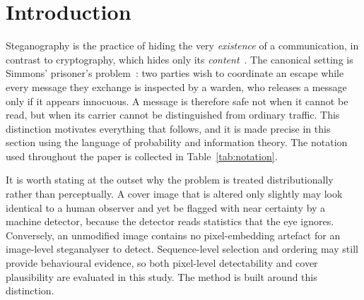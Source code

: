 \documentclass[10pt,a4paper]{article}
\theoremstyle{definition}
\begin{document}
\section{Introduction}\label{sec:intro}
Steganography is the practice of hiding the very \emph{existence} of a
communication, in contrast to cryptography, which hides only its
\emph{content}~\cite{provos2003}. The canonical setting is Simmons' prisoner's
problem~\cite{simmons}: two parties wish to coordinate an escape while every message they
exchange is inspected by a warden, who releases a message only if it appears
innocuous. A message is therefore safe not when it cannot be read, but when its
carrier cannot be distinguished from ordinary traffic. This distinction motivates
everything that follows, and it is made precise in this section using the language
of probability and information theory. The notation used throughout the paper is
collected in Table~\ref{tab:notation}.

It is worth stating at the outset why the problem is treated distributionally
rather than perceptually. A cover image that is altered only slightly may look
identical to a human observer and yet be flagged with near certainty by a machine
detector, because the detector reads statistics that the eye ignores. Conversely,
an unmodified image contains no pixel-embedding artefact for an image-level
steganalyser to detect. Sequence-level selection and ordering may still provide
behavioural evidence, so both pixel-level detectability and cover plausibility are
evaluated in this study. The method is built around this distinction.
\end{document}
